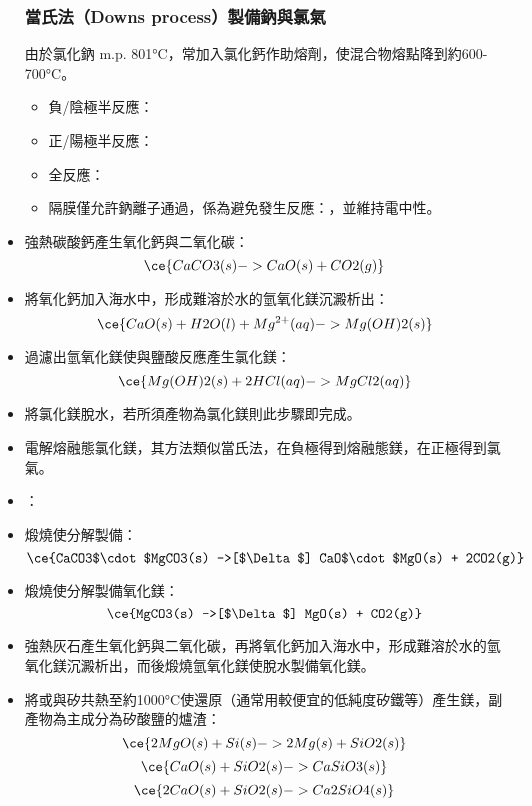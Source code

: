 \documentclass[a4paper,12pt]{report}
\begin{document}
\begin{itemize}
\subsubsection{當氏法（Downs process）製備鈉與氯氣}
由於氯化鈉 m.p. 801°C，常加入氯化鈣作助熔劑，使混合物熔點降到約600-700°C。
\begin{itemize}
\item 負/陰極半反應：
\item 正/陽極半反應：
\item 全反應：
\item 隔膜僅允許鈉離子通過，係為避免發生反應：，並維持電中性。
\end{itemize}
\ben
\item 強熱碳酸鈣產生氧化鈣與二氧化碳：
\[\ce{CaCO3(s) -> CaO(s) + CO2(g)}\]
\item 將氧化鈣加入海水中，形成難溶於水的氫氧化鎂沉澱析出：
\[\ce{CaO(s) + H2O(l) + Mg^{2+}(aq) -> Mg(OH)2(s)}\]
\item 過濾出氫氧化鎂使與鹽酸反應產生氯化鎂：
\[\ce{Mg(OH)2(s) + 2HCl(aq) -> MgCl2(aq)}\]
\item 將氯化鎂脫水，若所須產物為氯化鎂則此步驟即完成。
\item 電解熔融態氯化鎂，其方法類似當氏法，在負極得到熔融態鎂，在正極得到氯氣。
\een
{}
\bit
\item {}：
\bit
\item 煅燒使分解製備：
\[\ce{CaCO3$\cdot$MgCO3(s) ->[$\Delta$] CaO$\cdot$MgO(s) + 2CO2(g)}\]
\item 煅燒使分解製備氧化鎂：
\[\ce{MgCO3(s) ->[$\Delta$] MgO(s) + CO2(g)}\]
\item 強熱灰石產生氧化鈣與二氧化碳，再將氧化鈣加入海水中，形成難溶於水的氫氧化鎂沉澱析出，而後煅燒氫氧化鎂使脫水製備氧化鎂。
\eit
\item 將或與矽共熱至約1000°C使還原（通常用較便宜的低純度矽鐵等）產生鎂，副產物為主成分為矽酸鹽的爐渣：
\[\ce{2MgO(s) + Si(s) -> 2Mg(s) + SiO2(s)}\]
\[\ce{CaO(s) + SiO2(s) -> CaSiO3(s)}\]
\[\ce{2CaO(s) + SiO2(s) -> Ca2SiO4(s)}\]
\eit

\end{itemize}
\end{document}
